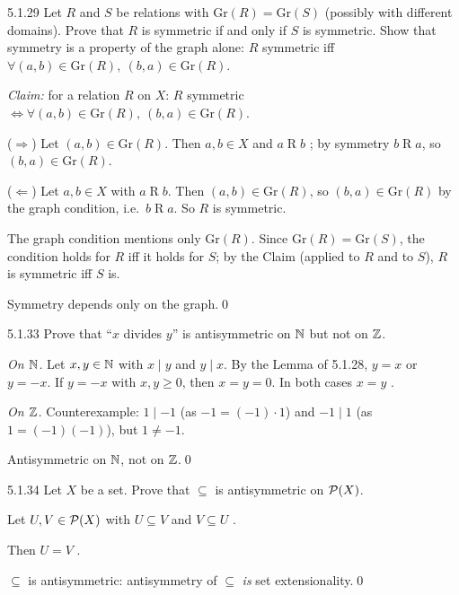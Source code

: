 \begin{bookex}[recommended]{5.1.29}
Let $R$ and $S$ be relations with $\mathrm{Gr}(R)=\mathrm{Gr}(S)$ (possibly with different domains). Prove that $R$ is symmetric if and only if $S$ is symmetric.
\solution
\plan Show that symmetry is a property of the graph alone: $R$ symmetric iff $\forall(a,b)\in\mathrm{Gr}(R),\ (b,a)\in\mathrm{Gr}(R)$.
\begin{steps}
\item \emph{Claim:} for a relation $R$ on $X$: $R$ symmetric $\Leftrightarrow\forall(a,b)\in\mathrm{Gr}(R),\ (b,a)\in\mathrm{Gr}(R)$.
\item ($\Rightarrow$) Let $(a,b)\in\mathrm{Gr}(R)$. Then $a,b\in X$ and $a\mathrel Rb$ ; by symmetry $b\mathrel Ra$, so $(b,a)\in\mathrm{Gr}(R)$.
\item ($\Leftarrow$) Let $a,b\in X$ with $a\mathrel Rb$. Then $(a,b)\in\mathrm{Gr}(R)$, so $(b,a)\in\mathrm{Gr}(R)$ by the graph condition, i.e.\ $b\mathrel Ra$. So $R$ is symmetric.
\item The graph condition mentions only $\mathrm{Gr}(R)$. Since $\mathrm{Gr}(R)=\mathrm{Gr}(S)$, the condition holds for $R$ iff it holds for $S$; by the Claim (applied to $R$ and to $S$), $R$ is symmetric iff $S$ is.
\end{steps}
\conclusion Symmetry depends only on the graph.\qed
\end{bookex}

\begin{bookex}[recommended]{5.1.33}
Prove that ``$x$ divides $y$'' is antisymmetric on $\mathbb{N}$ but not on $\mathbb{Z}$.
\solution
\begin{steps}
\item \emph{On $\mathbb{N}$.} Let $x,y\in\mathbb{N}$ with $x\mid y$ and $y\mid x$. By the Lemma of 5.1.28, $y=x$ or $y=-x$. If $y=-x$ with $x,y\ge0$, then $x=y=0$. In both cases $x=y$ .
\item \emph{On $\mathbb{Z}$.} Counterexample: $1\mid-1$ (as $-1=(-1)\cdot1$) and $-1\mid1$ (as $1=(-1)(-1)$), but $1\ne-1$.
\end{steps}
\conclusion Antisymmetric on $\mathbb{N}$, not on $\mathbb{Z}$.\qed
\end{bookex}

\begin{bookex}[recommended]{5.1.34}
Let $X$ be a set. Prove that $\subseteq$ is antisymmetric on $\mathcal{P}(X)$.
\solution
\begin{steps}
\item Let $U,V\in\mathcal{P}(X)$ with $U\subseteq V$ and $V\subseteq U$ .
\item Then $U=V$ .
\end{steps}
\conclusion $\subseteq$ is antisymmetric: antisymmetry of $\subseteq$ \emph{is} set extensionality.\qed
\end{bookex}

